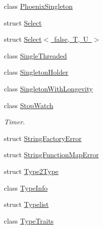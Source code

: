 \begin{DoxyCompactItemize}
class \mbox{\hyperlink{classUtil_1_1PhoenixSingleton}{Phoenix\+Singleton}}
\item 
struct \mbox{\hyperlink{structUtil_1_1Select}{Select}}
\item 
struct \mbox{\hyperlink{structUtil_1_1Select_3_01false_00_01T_00_01U_01_4}{Select$<$ false, T, U $>$}}
\item 
class \mbox{\hyperlink{classUtil_1_1SingleThreaded}{Single\+Threaded}}
\item 
class \mbox{\hyperlink{classUtil_1_1SingletonHolder}{Singleton\+Holder}}
\item 
class \mbox{\hyperlink{classUtil_1_1SingletonWithLongevity}{Singleton\+With\+Longevity}}
\item 
class \mbox{\hyperlink{classUtil_1_1StopWatch}{Stop\+Watch}}
\begin{DoxyCompactList}\small\item\em Timer. \end{DoxyCompactList}\item 
struct \mbox{\hyperlink{structUtil_1_1StringFactoryError}{String\+Factory\+Error}}
\item 
struct \mbox{\hyperlink{structUtil_1_1StringFunctionMapError}{String\+Function\+Map\+Error}}
\item 
struct \mbox{\hyperlink{structUtil_1_1Type2Type}{Type2\+Type}}
\item 
class \mbox{\hyperlink{classUtil_1_1TypeInfo}{Type\+Info}}
\item 
struct \mbox{\hyperlink{structUtil_1_1Typelist}{Typelist}}
\item 
class \mbox{\hyperlink{classUtil_1_1TypeTraits}{Type\+Traits}}
\end{DoxyCompactItemize}
